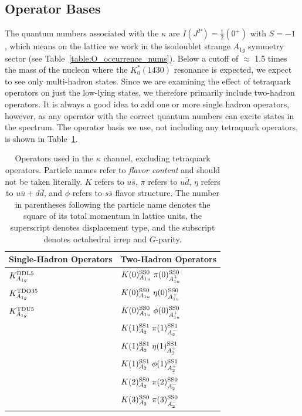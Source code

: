 \subsection{Operator Bases}
The quantum numbers associated with the $\kappa$ are $I(J^{P})=\frac{1}{2}(0^+)$ with $S=-1$ , which means on the lattice we work in the isodoublet strange $A_{1g}$ symmetry sector (see Table~\ref{table:O_occurrence_nums}). Below a cutoff of $\approx$ 1.5 times the mass of the nucleon where the $K_0^*(1430)$ resonance is expected, we expect to see only multi-hadron states. Since we are examining the effect of tetraquark operators on just the low-lying states, we therefore primarily include two-hadron operators. It is always a good idea to add one or more single hadron operators, however, as any operator with the correct quantum numbers can excite states in the spectrum. The operator basis we use, not including any tetraquark operators, is shown in Table~\ref{table:kappa_ops_no_tq}.
\begin{table}
  \centering
  \begin{tabular}{l|l}
    \textbf{Single-Hadron Operators} & \textbf{Two-Hadron Operators}\\
    \hline
    $K^{\rm{DDL}5}_{A_{1g}}$ & $K(0)^{\rm{SS}0}_{A_{1u}}\; \pi(0)^{\rm{SS}0}_{A_{1u}^+}$\\
    $K^{\rm{TDO3}5}_{A_{1g}}$ & $K(0)^{\rm{SS}0}_{A_{1u}}\; \eta(0)^{\rm{SS}0}_{A_{1u}^+}$ \\
    $K^{\rm{TDU}5}_{A_{1g}}$ & $K(0)^{\rm{SS}0}_{A_{1u}}\; \phi(0)^{\rm{SS}0}_{A_{1u}^+}$ \\
    & $K(1)^{\rm{SS}1}_{A_2}\; \pi(1)^{\rm{SS}1}_{A_2^-}$ \\
    & $K(1)^{\rm{SS}1}_{A_2}\; \eta(1)^{\rm{SS}1}_{A_2^+}$ \\
    & $K(1)^{\rm{SS}1}_{A_2}\; \phi(1)^{\rm{SS}1}_{A_2^+}$ \\
    & $K(2)^{\rm{SS}0}_{A_2}\; \pi(2)^{\rm{SS}0}_{A_2^-}$ \\
    & $K(3)^{\rm{SS}0}_{A_2}\; \pi(3)^{\rm{SS}0}_{A_2^-}$
  \end{tabular}
  \caption{Operators used in the $\kappa$ channel, excluding tetraquark operators. Particle names refer to \emph{flavor content} and should not be taken literally. $K$ refers to $u\overline s$, $\pi$ refers to $u\overline d$, $\eta$ refers to $u\overline u + d\overline d$, and $\phi$ refers to $s\overline s$ flavor structure. The number in parentheses following the particle name denotes the square of its total momentum in lattice units, the superscript denotes displacement type, and the subscript denotes octahedral irrep and $G$-parity.}
  \label{table:kappa_ops_no_tq}
\end{table}
